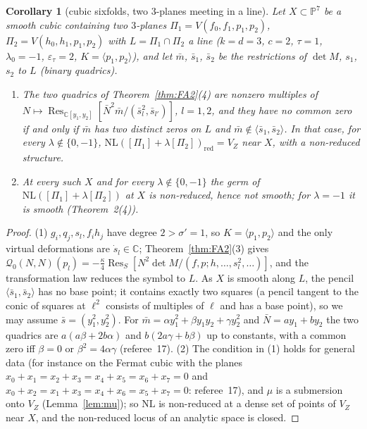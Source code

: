 \documentclass[11pt]{article}
\numberwithin{equation}{section}
\newtheorem{corollary}[theorem]{Corollary}
\theoremstyle{remark}
\newcommand{\PP}{\mathbb{P}}
\newcommand{\CC}{\mathbb{C}}
\newcommand{\NL}{\mathrm{NL}}
\newcommand{\VZ}{V_Z}
\newcommand{\Res}{\operatorname{Res}}
\newcommand{\lz}{\lambda_0}
\newcommand{\et}{\varepsilon_\tau}
\begin{document}
\begin{corollary}[cubic sixfolds, two $3$-planes meeting in a line]\label{cor:six}
Let $X\subset\PP^7$ be a smooth cubic containing two $3$-planes $\Pi_1=V(f_0,f_1,p_1,p_2)$,
$\Pi_2=V(h_0,h_1,p_1,p_2)$ with $L=\Pi_1\cap\Pi_2$ a line ($k=d=3$, $c=2$, $\tau=1$, $\lz=-1$, $\et=2$,
$K=\langle p_1,p_2\rangle$), and let $\bar m$, $\bar s_1$, $\bar s_2$ be the restrictions of $\det M$, $s_1$, $s_2$ to
$L$ (binary quadrics).
\begin{enumerate}
\item The two quadrics of Theorem~\ref{thm:FA2}(4) are nonzero multiples of
$N\mapsto\Res_{\CC[y_1,y_2]}[\bar N^2\bar m/(\bar s_l^2,\bar s_{l'})]$, $l=1,2$, and they have no common zero if
and only if $\bar m$ has two distinct zeros on $L$ and $\bar m\notin\langle\bar s_1,\bar s_2\rangle$. In that case,
for every $\lambda\notin\{0,-1\}$, $\NL([\Pi_1]+\lambda[\Pi_2])_{\mathrm{red}}=\VZ$ near $X$, with a non-reduced
structure.
\item At every such $X$ and for every $\lambda\notin\{0,-1\}$ the germ of $\NL([\Pi_1]+\lambda[\Pi_2])$ at $X$ is
non-reduced, hence not smooth; for $\lambda=-1$ it is smooth (Theorem~2(4)).
\end{enumerate}
\end{corollary}
\begin{proof}
(1) $g_i,q_j,s_l,f_ih_j$ have degree $2>\sigma'=1$, so $K=\langle p_1,p_2\rangle$ and the only virtual deformations
are $\dot s_l\in\CC$; Theorem~\ref{thm:FA2}(3) gives $\mathcal Q_0(N,N)(p_l)=-\frac\kappa4\Res_S[N^2\det M/(f,p;h,\dots,s_l^2,\dots)]$,
and the transformation law reduces the symbol to $L$. As $X$ is smooth along $L$, the pencil
$\langle\bar s_1,\bar s_2\rangle$ has no base point; it contains exactly two squares (a pencil tangent to the conic of squares at $\ell^2$ consists
of multiples of $\ell$ and has a base point), so we may assume
$\bar s=(y_1^2,y_2^2)$. For $\bar m=\alpha y_1^2+\beta y_1y_2+\gamma y_2^2$ and $\bar N=ay_1+by_2$ the two quadrics
are $a(a\beta+2b\alpha)$ and $b(2a\gamma+b\beta)$ up to constants, with a common zero iff $\beta=0$ or
$\beta^2=4\alpha\gamma$ (referee~17). (2) The condition in (1) holds for general data (for instance on the Fermat
cubic with the planes $x_0+x_1=x_2+x_3=x_4+x_5=x_6+x_7=0$ and $x_0+x_2=x_1+x_3=x_4+x_6=x_5+x_7=0$: referee~17), and
$\mu$ is a submersion onto $\VZ$ (Lemma~\ref{lem:mu}); so $\NL$ is non-reduced at a dense set of points of $\VZ$
near $X$, and the non-reduced locus of an analytic space is closed.
\end{proof}
\end{document}
